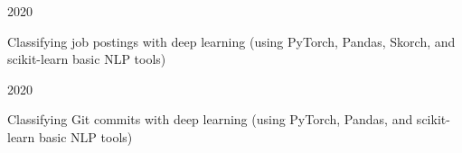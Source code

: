 

\begin{cvprojects}

  \cvproject
    {} %
    {} %
    {} %
    {2020} %
    {
      \begin{cvitems} %
        \item {Classifying job postings with deep learning (using PyTorch, Pandas, Skorch, and scikit-learn basic NLP tools)}
      \end{cvitems}
    }

  \cvproject
    {} %
    {} %
    {} %
    {2020} %
    {
      \begin{cvitems} %
        \item {Classifying Git commits with deep learning (using PyTorch, Pandas, and scikit-learn basic NLP tools)}
      \end{cvitems}
    }



\end{cvprojects}

